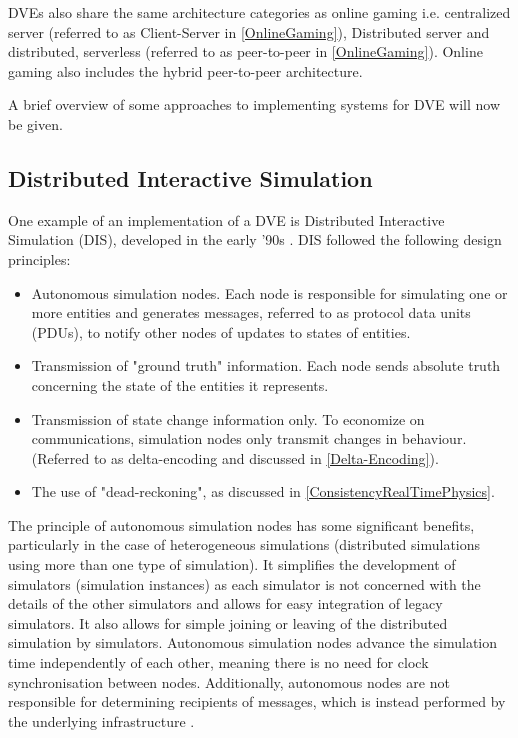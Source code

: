 DVEs also share the same architecture categories as online gaming \cite{fujimoto2000parallel} i.e. centralized server (referred to as Client-Server in \ref{OnlineGaming}), Distributed server and distributed, serverless (referred to as peer-to-peer in \ref{OnlineGaming}). Online gaming also includes the hybrid peer-to-peer architecture.

A brief overview of some approaches to implementing systems for DVE will now be given.

\subsection{Distributed Interactive Simulation}
One example of an implementation of a DVE is Distributed Interactive Simulation (DIS), developed in the early '90s  \cite{fujimoto2000parallel}.
DIS followed the following design principles:
\begin{itemize}
	\item Autonomous simulation nodes.
	Each node is responsible for simulating one or more entities and generates messages, referred to as protocol data units (PDUs), to notify other nodes of updates to states of entities.
	\item Transmission of "ground truth" information. 
	Each node sends absolute truth concerning the state of the entities it represents.
	\item Transmission of state change information only. To economize on communications, simulation nodes only transmit changes in behaviour. (Referred to as delta-encoding and discussed in \ref{Delta-Encoding}).
	\item The use of "dead-reckoning", as discussed in \ref{ConsistencyRealTimePhysics}.
\end{itemize}

The principle of autonomous simulation nodes has some significant benefits, particularly in the case of heterogeneous simulations (distributed simulations using more than one type of simulation). It simplifies the development of simulators (simulation instances) as each simulator is not concerned with the details of the other simulators and allows for easy integration of legacy simulators. It also allows for simple joining or leaving of the distributed simulation by simulators. Autonomous simulation nodes advance the simulation time independently of each other, meaning there is no need for clock synchronisation between nodes. Additionally, autonomous nodes are not responsible for determining recipients of messages, which is instead performed by the underlying infrastructure \cite{fujimoto2000parallel}.


